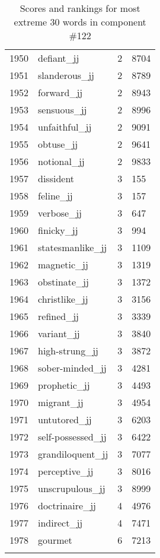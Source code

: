 \begin{longtable}[!htbp]{| rlr@{.}l |}
    1950 & defiant\_jj & 2 & 8704 \\
    1951 & slanderous\_jj & 2 & 8789 \\
    1952 & forward\_jj & 2 & 8943 \\
    1953 & sensuous\_jj & 2 & 8996 \\
    1954 & unfaithful\_jj & 2 & 9091 \\
    1955 & obtuse\_jj & 2 & 9641 \\
    1956 & notional\_jj & 2 & 9833 \\
    1957 & dissident & 3 & 155 \\
    1958 & feline\_jj & 3 & 157 \\
    1959 & verbose\_jj & 3 & 647 \\
    1960 & finicky\_jj & 3 & 994 \\
    1961 & statesmanlike\_jj & 3 & 1109 \\
    1962 & magnetic\_jj & 3 & 1319 \\
    1963 & obstinate\_jj & 3 & 1372 \\
    1964 & christlike\_jj & 3 & 3156 \\
    1965 & refined\_jj & 3 & 3339 \\
    1966 & variant\_jj & 3 & 3840 \\
    1967 & high-strung\_jj & 3 & 3872 \\
    1968 & sober-minded\_jj & 3 & 4281 \\
    1969 & prophetic\_jj & 3 & 4493 \\
    1970 & migrant\_jj & 3 & 4954 \\
    1971 & untutored\_jj & 3 & 6203 \\
    1972 & self-possessed\_jj & 3 & 6422 \\
    1973 & grandiloquent\_jj & 3 & 7077 \\
    1974 & perceptive\_jj & 3 & 8016 \\
    1975 & unscrupulous\_jj & 3 & 8999 \\
    1976 & doctrinaire\_jj & 4 & 4976 \\
    1977 & indirect\_jj & 4 & 7471 \\
    1978 & gourmet & 6 & 7213 \\
    \hline
    \caption{Scores and rankings for most extreme 30 words in component \#122} \\
\end{longtable}

